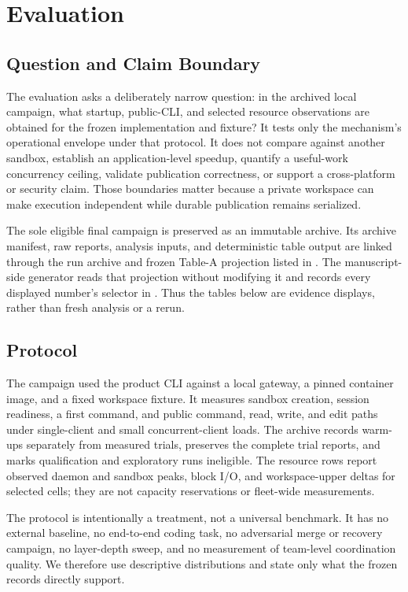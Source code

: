 \section{Evaluation}
\label{sec:evaluation}

\subsection{Question and Claim Boundary}

The evaluation asks a deliberately narrow question: in the archived local
campaign, what startup, public-CLI, and selected resource observations are
obtained for the frozen implementation and fixture?  It tests only the
mechanism's operational envelope under that protocol.  It does not compare
against another sandbox, establish an application-level speedup, quantify a
useful-work concurrency ceiling, validate publication correctness, or support
a cross-platform or security claim.  Those boundaries matter because a
private workspace can make execution independent while durable publication
remains serialized.

The sole eligible final campaign is preserved as an immutable archive. Its
archive manifest, raw reports, analysis inputs, and deterministic table output
are linked through the run archive and frozen Table-A projection listed in
.
The manuscript-side generator reads that projection without modifying it and
records every displayed number's selector in
.  Thus the tables below are
evidence displays, rather than fresh analysis or a rerun.

\subsection{Protocol}

The campaign used the product CLI against a local gateway, a pinned container
image, and a fixed workspace fixture.  It measures sandbox creation, session
readiness, a first command, and public command, read, write, and edit paths
under single-client and small concurrent-client loads.  The archive records
warm-ups separately from measured trials, preserves the complete trial
reports, and marks qualification and exploratory runs ineligible.  The
resource rows report observed daemon and sandbox peaks, block I/O, and
workspace-upper deltas for selected cells; they are not capacity reservations
or fleet-wide measurements.

The protocol is intentionally a treatment, not a universal benchmark.  It has
no external baseline, no end-to-end coding task, no adversarial merge or
recovery campaign, no layer-depth sweep, and no measurement of team-level
coordination quality.  We therefore use descriptive distributions and state
only what the frozen records directly support.


